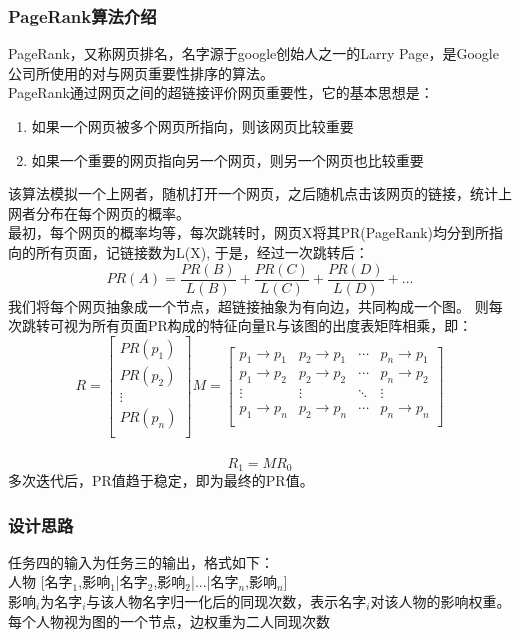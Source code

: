 \documentclass[a4paper,UTF8]{article}
\numberwithin{equation}{section}
\begin{document}
\subsubsection{PageRank算法介绍}
PageRank，又称网页排名，名字源于google创始人之一的Larry Page，是Google公司所使用的对与网页重要性排序的算法。\\
PageRank通过网页之间的超链接评价网页重要性，它的基本思想是：\\
\begin{enumerate}[1)]
    \item 如果一个网页被多个网页所指向，则该网页比较重要
    \item 如果一个重要的网页指向另一个网页，则另一个网页也比较重要
\end{enumerate}
该算法模拟一个上网者，随机打开一个网页，之后随机点击该网页的链接，统计上网者分布在每个网页的概率。\\
最初，每个网页的概率均等，每次跳转时，网页X将其PR(PageRank)均分到所指向的所有页面，记链接数为L(X),
于是，经过一次跳转后：\\
$$
PR(A)=\frac{PR(B)}{L(B)}+\frac{PR(C)}{L(C)}+\frac{PR(D)}{L(D)}+...
$$
我们将每个网页抽象成一个节点，超链接抽象为有向边，共同构成一个图。
则每次跳转可视为所有页面PR构成的特征向量R与该图的出度表矩阵相乘，即：\\
$$R=
\begin{bmatrix}
    PR(p_1) \\
    PR(p_2)\\
    \vdots\\
    PR(p_n)\\
\end{bmatrix}
M=
\begin{bmatrix}
    p_1 \rightarrow p_1 & p_2 \rightarrow p_1 & \cdots & p_n \rightarrow p_1\\
    p_1 \rightarrow p_2 & p_2 \rightarrow p_2 & \cdots & p_n \rightarrow p_2\\
    \vdots & \vdots & \ddots & \vdots\\
    p_1 \rightarrow p_n & p_2 \rightarrow p_n & \cdots & p_n \rightarrow p_n\\
\end{bmatrix}
$$
\\
$$
R_1=M R_0
$$
多次迭代后，PR值趋于稳定，即为最终的PR值。

\subsubsection{设计思路}
任务四的输入为任务三的输出，格式如下：\\
人物 [名字$_1$,影响$_1$|名字$_2$,影响$_2$|...|名字$_n$,影响$_n$] \\
影响$_i$为名字$_i$与该人物名字归一化后的同现次数，表示名字$_i$对该人物的影响权重。\\
每个人物视为图的一个节点，边权重为二人同现次数
\end{document}
